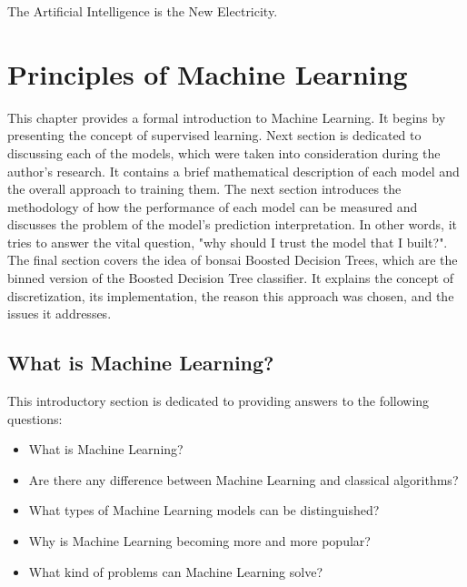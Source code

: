 \begin{savequote}[75mm] 
The Artificial Intelligence is the New Electricity.
\end{savequote}

\chapter{Principles of Machine Learning}
\label{chapter:ML}
This chapter provides a formal introduction to Machine Learning. It begins by presenting the concept of supervised learning. Next section is dedicated to discussing each of the models, which were taken into consideration during the author's research. It contains a brief mathematical description of each model and the overall approach to training them. The next section introduces the methodology of how the performance of each model can be measured and discusses the problem of the model's prediction interpretation. In other words, it tries to answer the vital question, "why should I trust the model that I built?". 
The final section covers the idea of bonsai Boosted Decision Trees, which are the binned version of the Boosted Decision Tree classifier. It explains the concept of discretization, its implementation, the reason this approach was chosen, and the issues it addresses. 

\section{What is Machine Learning?}
This introductory section is dedicated to providing answers to the following questions: 
\begin{itemize}
    \item What is Machine Learning? 
    \item Are there any difference between Machine Learning and classical algorithms? 
    \item What types of Machine Learning models can be distinguished? 
    \item Why is Machine Learning becoming more and more popular? 
    \item What kind of problems can Machine Learning solve? 
\end{itemize}

